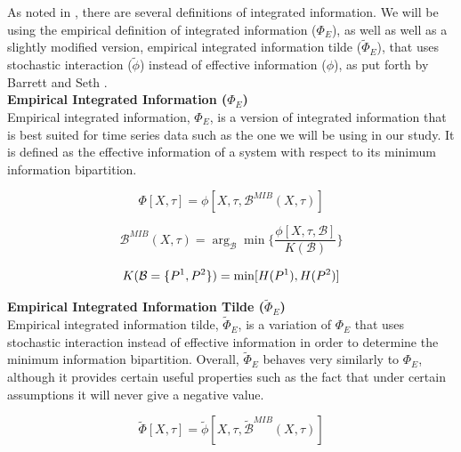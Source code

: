 \documentclass[a4paper,11pt]{article}
\begin{document}
As noted in \cite{Barrett2011}, there are several definitions of integrated information. We will be using the empirical definition of integrated information ($\Phi_{E}$), as well as well as a slightly modified version, empirical integrated information tilde ($\widetilde{\Phi}_{E}$), that uses stochastic interaction ($\tilde{\phi}$) instead of effective information ($\phi$), as put forth by Barrett and Seth \cite{Barrett2011}.\\

\noindent\textbf{Empirical Integrated Information ($\Phi_{E}$)}\\[2.5mm]
\noindent Empirical integrated information, $\Phi_{E}$, is a version of integrated information that is best suited for time series data such as the one we will be using in our study. It is defined as the effective information of a system with respect to its minimum information bipartition.

\begin{equation}
\label{eq:ii}
\Phi [X, \tau] = \phi [X, \tau, \mathcal{B}^{MIB}(X, \tau)]
\end{equation}

\begin{equation}
\label{eq:mib}
\mathcal{B}^{MIB}(X, \tau) = \arg_{\mathcal{B}} \min \Big\lbrace \frac{\phi [X, \tau, \mathcal{B}]}{K(\mathcal{B})} \Big\rbrace
\end{equation}

\begin{equation}
\label{eq:norm}
K(\mathcal{B} = \lbrace P^1, P^2 \rbrace) = \min[H(P^1), H(P^2)]\\[2.5mm]
\end{equation}

\noindent\textbf{Empirical Integrated Information Tilde ($\widetilde{\Phi}_{E}$)}\\[2.5mm]
\noindent Empirical integrated information tilde, $\widetilde{\Phi}_{E}$, is a variation of $\Phi_{E}$ that uses stochastic interaction instead of effective information in order to determine the minimum information bipartition. Overall, $\widetilde{\Phi}_{E}$ behaves very similarly to $\Phi_{E}$, although it provides certain useful properties such as the fact that under certain assumptions it will never give a negative value.

\begin{equation}
\label{eq:ii-tilde}
\widetilde{\Phi} [X, \tau] = \tilde{\phi} [X, \tau, \widetilde{\mathcal{B}}^{MIB}(X, \tau)]
\end{equation}
\end{document}
